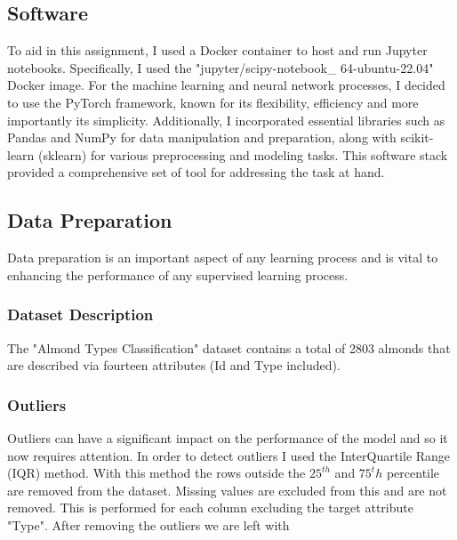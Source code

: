\documentclass[conference]{IEEEtran}
\begin{document}
\subsection{Software}
To aid in this assignment, I used a Docker container to host and run Jupyter notebooks. Specifically, I used the "jupyter/scipy-notebook\_ 64-ubuntu-22.04" Docker image. For the machine learning and neural network processes, I decided to use the PyTorch framework, known for its flexibility, efficiency and more importantly its simplicity. Additionally, I incorporated essential libraries such as Pandas and NumPy for data manipulation and preparation, along with scikit-learn (sklearn) for various preprocessing and modeling tasks. This software stack provided a comprehensive set of tool for addressing the task at hand.


\subsection{Data Preparation}
Data preparation is an important aspect of any learning process and is vital to enhancing the performance of any supervised learning process.\\
\subsubsection{Dataset Description}
The "Almond Types Classification" dataset contains a total of 2803 almonds that are described via fourteen attributes (Id and Type included).\\
\subsubsection{Outliers}
Outliers can have a significant impact on the performance of the model and so it now requires attention. In order to detect outliers I used the InterQuartile Range (IQR) method. With this method the rows outside the $25^{th}$ and $75^th$ percentile are removed from the dataset. Missing values are excluded from this and are not removed. This is performed for each column excluding the target attribute "Type". After removing the outliers we are left with
\end{document}
